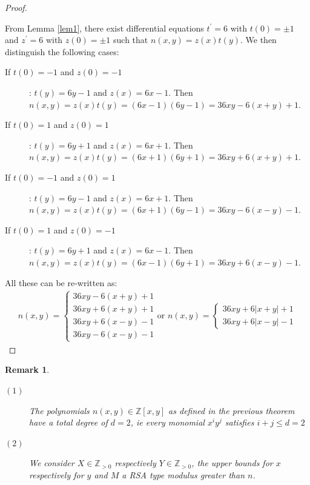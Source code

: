 \documentclass[sigconf,balance=false]{acmart}
\newtheorem{remark}{Remark}[section]
\begin{document}
\begin{proof} \ \\ \rm{
From Lemma \ref{lem1}, there exist differential equations $t^{'}=6$ with $t(0)=\pm 1$ and $z^{'}=6$ with $z(0)=\pm 1$ such that $n(x, y)=z(x)t(y)$.
We then distinguish the following cases:
\begin{description}
\item[If $t(0)=-1$ and $z(0)=-1$]: $t(y)=6y-1$ and $z(x)=6x-1$. Then $n(x,y)=z(x)t(y)=(6x-1)(6y-1)=36xy-6(x+y)+1$.
\item[If $t(0)=1$ and $z(0)=1$]: $t(y)=6y+1$ and $z(x)=6x+1$. Then $n(x,y)=z(x)t(y)=(6x+1)(6y+1)=36xy+6(x+y)+1$.
\item[If $t(0)=-1$ and $z(0)=1$]: $t(y)=6y-1$ and $z(x)=6x+1$. Then $n(x,y)=z(x)t(y)=(6x+1)(6y-1)=36xy-6(x-y)-1$.
\item[If $t(0)=1$ and $z(0)=-1$]: $t(y)=6y+1$ and $z(x)=6x-1$. Then $n(x,y)=z(x)t(y)=(6x-1)(6y+1)=36xy+6(x-y)-1$.
\end{description}

All these can be re-written as:
\begin{eqnarray*}
n(x, y)=
\left\lbrace
\begin{array}{ll}
36xy-6(x+y)+1\\
36xy+6(x+y)+1\\
36xy+6(x-y)-1\\
36xy-6(x-y)-1
\end{array} \right. \text{or } 
n(x, y)=
\left\lbrace
\begin{array}{ll}
36xy+6\left|x+y\right|+1\\
36xy+6\left|x-y \right|-1
\end{array} \right.
\end{eqnarray*}
}
\end{proof}

\begin{remark} \ \rm{
\begin{description}
\item[$(1)$] The polynomials $n(x, y)\in\mathbb{Z}[x, y]$ as defined in the previous theorem have a total degree of $d=2$, ie every monomial $x^{i}y^{j}$ satisfies $i+j \leq d=2$
\item[$(2)$] We consider $X\in\mathbb{Z}_{>0}$ respectively $Y\in\mathbb{Z}_{>0}$, the upper bounds for $x$ respectively for $y$ and $M$ a RSA type modulus greater than $n$.
\end{description}
}
\end{remark}
\end{document}

